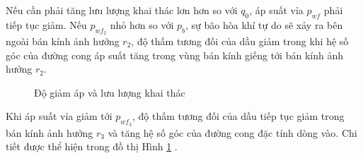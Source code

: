 \documentclass[12pt,a4paper]{report}
\begin{document}
Nếu cần phải tăng lưu lượng khai thác lơn hơn so với $q_0$, áp suất vỉa $p_{wf}$ phải tiếp tục giảm. Nếu $p_{wf_2}$ nhỏ hơn so với $p_b$, sự bão hòa khí tự do sẽ xảy ra bên ngoài bán kính ảnh hưởng $r_2$, độ thấm tương đối của dầu giảm trong khi hệ số góc của đường cong áp suất tăng trong vùng bán kính giếng tới bán kính ảnh hưởng $r_2$.
	\begin{figure}[h]
		\centering
		\hfill
		\hfill
		\caption{Độ giảm áp và lưu lượng khai thác}
		\label{fig:reservoir_pressure_relationship}
	\end{figure}
\newpage
Khi áp suất vỉa giảm tới $p_{wf_3}$, độ thấm tương đối của dầu tiếp tục giảm trong bán kính ảnh hưởng $r_3$ và tăng hệ số góc của đường cong đặc tính dòng vào. Chi tiết được thể hiện trong đồ thị Hình \ref{fig:reservoir_pressure_relationship} \cite{dale1991production}.
\end{document}
